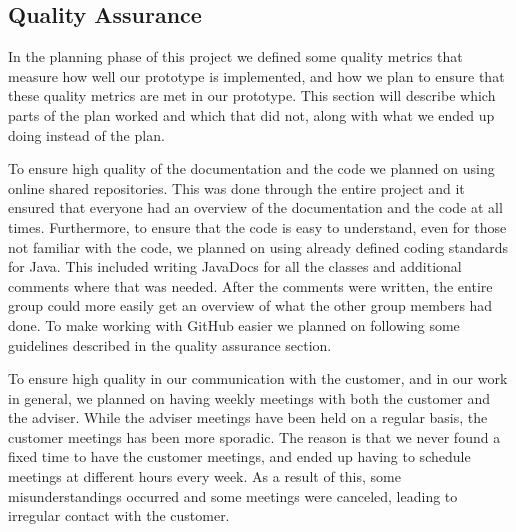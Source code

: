 \documentclass[../document]{subfiles}
\begin{document}
\subsection{Quality Assurance}
In the planning phase of this project we defined some quality metrics that measure how well our prototype is implemented, and how we plan to ensure that these quality metrics are met in our prototype. This section will describe which parts of the plan worked and which that did not, along with what we ended up doing instead of the plan.

To ensure high quality of the documentation and the code we planned on using online shared repositories. This was done through the entire project and it ensured that everyone had an overview of the documentation and the code at all times. Furthermore, to ensure that the code is easy to understand, even for those not familiar with the code, we planned on using already defined coding standards for Java. This included writing JavaDocs for all the classes and additional comments where that was needed. After the comments were written, the entire group could more easily get an overview of what the other group members had done. To make working with GitHub easier we planned on following some guidelines described in the quality assurance section.

To ensure high quality in our communication with the customer, and in our work in general, we planned on having weekly meetings with both the customer and the adviser. While the adviser meetings have been held on a regular basis, the customer meetings has been more sporadic. The reason is that we never found a fixed time to have the customer meetings, and ended up having to schedule meetings at different hours every week. As a result of this, some misunderstandings occurred and some meetings were canceled, leading to irregular contact with the customer.
\end{document}
